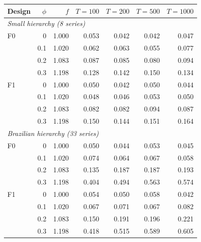 \centering\small
\begin{tabular}{lrrrrrr}
\hline
Design & $\phi$ & $f$ & $T = 100$ & $T = 200$ & $T = 500$ & $T = 1000$ \\
\hline
\multicolumn{7}{l}{\emph{Small hierarchy (8 series)}} \\
F0 & 0 & 1.000 & 0.053 & 0.042 & 0.042 & 0.047 \\
 & 0.1 & 1.020 & 0.062 & 0.063 & 0.055 & 0.077 \\
 & 0.2 & 1.083 & 0.087 & 0.085 & 0.080 & 0.094 \\
 & 0.3 & 1.198 & 0.128 & 0.142 & 0.150 & 0.134 \\
F1 & 0 & 1.000 & 0.050 & 0.042 & 0.050 & 0.044 \\
 & 0.1 & 1.020 & 0.048 & 0.046 & 0.053 & 0.050 \\
 & 0.2 & 1.083 & 0.082 & 0.082 & 0.094 & 0.087 \\
 & 0.3 & 1.198 & 0.150 & 0.144 & 0.151 & 0.164 \\
\multicolumn{7}{l}{\emph{Brazilian hierarchy (33 series)}} \\
F0 & 0 & 1.000 & 0.050 & 0.044 & 0.053 & 0.045 \\
 & 0.1 & 1.020 & 0.074 & 0.064 & 0.067 & 0.058 \\
 & 0.2 & 1.083 & 0.135 & 0.187 & 0.187 & 0.193 \\
 & 0.3 & 1.198 & 0.404 & 0.494 & 0.563 & 0.574 \\
F1 & 0 & 1.000 & 0.054 & 0.050 & 0.058 & 0.042 \\
 & 0.1 & 1.020 & 0.067 & 0.071 & 0.067 & 0.082 \\
 & 0.2 & 1.083 & 0.150 & 0.191 & 0.196 & 0.221 \\
 & 0.3 & 1.198 & 0.418 & 0.515 & 0.589 & 0.605 \\
\hline
\end{tabular}
